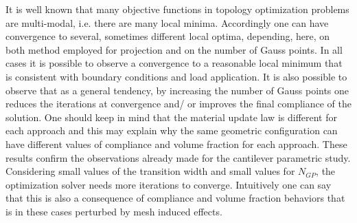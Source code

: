  It is well known that many objective functions in topology optimization problems are multi-modal, i.e. there are many local minima. Accordingly one can have convergence to several, sometimes different local optima, depending, here, on both method employed for projection and on the number of Gauss points.
 In all cases it is possible to observe a convergence to a reasonable local minimum that is consistent with boundary conditions and load application. It is also possible to observe that as a general tendency, by increasing the number of Gauss points one reduces the iterations at convergence and/ or improves the final compliance of the solution. One should keep in mind that the material update law is different for each approach and this may explain why the same geometric configuration can have different values of compliance and volume fraction for each approach. These results confirm the observations already made for the cantilever parametric study. Considering small values of the transition width and small values for $N_{GP}$, the optimization solver needs more iterations to converge. Intuitively one can say that this is also a consequence of compliance and volume fraction behaviors that is in these cases perturbed by mesh induced effects.
